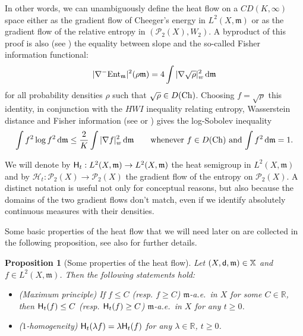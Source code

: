 \documentclass[reqno,11pt]{article}
\numberwithin{equation}{section}
\newcommand{\C}{\mathbb{C}}
\newcommand{\R}{\mathbb{R}}
\newcommand{\mm}{{\mbox{\boldmath$m$}}}
\newcommand{\sfd}{{\sf d}}
\renewcommand{\d}{{\mathrm d}}
\newcommand{\ProbabilitiesTwo}[1]{\mathscr P_2(#1)}     %
\newtheorem{proposition}[theorem]{Proposition}
\newcommand{\entv}{{\rm Ent}_{\mm}}                    %
\newcommand{\probt}{\ProbabilitiesTwo}
\newcommand{\X}{\mathbb X}
\newcommand{\weakgrad}[1]{|\nabla #1|_w}                %
\renewcommand{\C}{{\rm Ch}}
\newcommand{\heatl}{{\sf H}}
\newcommand{\heatw}{{\mathscr H}}
\renewcommand{\mm}{\mathfrak m}
\begin{document}
In other words, we can unambiguously define the heat flow on a
$CD(K,\infty)$ space either as the gradient flow of Cheeger's energy
in $L^2(X,\mm)$ or as the gradient flow of the relative entropy in
$(\probt X,W_2)$. A byproduct of this proof is also (see
\cite[Theorem~9.3(i)]{Ambrosio-Gigli-Savare11}) the equality between
slope and the so-called Fisher information functional:
\begin{equation}\label{eq:slopeFisher}
|\nabla^-\entv|^2(\rho\mm)=4\int\weakgrad{\sqrt{\rho}}^2\,\d\mm
\end{equation}
for all probability densities $\rho$ such that $\sqrt{\rho}\in
D(\C)$. Choosing $f=\sqrt{\rho}$ this identity, in conjunction with
the $HWI$ inequality relating entropy, Wasserstein distance and
Fisher information (see \cite{Lott-Villani-Poincare} or
\cite[Proposition~7.18]{Ambrosio-Gigli11}) gives the log-Sobolev
inequality
\begin{equation}\label{eq:logSobolev}
\int f^2\log f^2\,\d\mm\leq\frac{2}{K}\int\weakgrad{f}^2\,\d\mm
\qquad\text{whenever $f\in D(\C)$ and $\int f^2\,\d\mm=1$.}
\end{equation}

We will denote by $\heatl_t:L^2(X,\mm)\to L^2(X,\mm)$ the heat
semigroup in $L^2(X,\mm)$ and by $\heatw_t:\probt X\to\probt X$ the
gradient flow of the entropy on $\probt X$. A distinct notation is
useful not only for conceptual reasons, but also because the domains
of the two gradient flows don't match, even if we identify
absolutely continuous measures with their densities.

Some basic properties of the heat flow that we will need later on
are collected in the following proposition, see
\cite[Theorem~4.16]{Ambrosio-Gigli-Savare11} also for further
details.

\begin{proposition}[Some properties of the heat flow]\label{prop:proprheat}
Let $(X,\sfd,\mm)\in\X$ and $f\in L^2(X,\mm)$. Then the following
statements hold:
\begin{itemize}
\item[(i)] (Maximum principle) If $f\leq C$ (resp. $f\geq C$) $\mm$-a.e.~in $X$ for some
$C\in\R$, then $\heatl_t(f)\leq C$ (resp. $\heatl_t(f)\geq C$)
$\mm$-a.e.~in $X$ for any $t\geq 0$.
\item[(ii)] ($1$-homogeneity)
$\heatl_t(\lambda f)=\lambda\heatl_t(f)$ for any $\lambda\in\R$,
$t\geq 0$.
\end{itemize}
\end{proposition}
\end{document}
